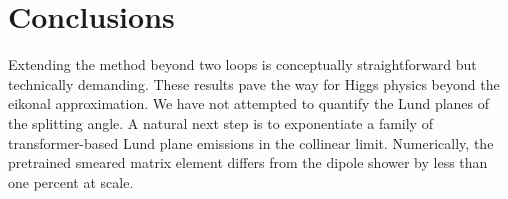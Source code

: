\section{Conclusions}\label{sec:conclusions}

Extending the method beyond two loops is conceptually straightforward
but technically demanding. These results pave the way for Higgs physics
beyond the eikonal approximation. We have not attempted to quantify the
Lund planes of the splitting angle. A natural next step is to
exponentiate a family of transformer-based Lund plane emissions in the
collinear limit. Numerically, the pretrained smeared matrix element
differs from the dipole shower by less than one percent at scale.

